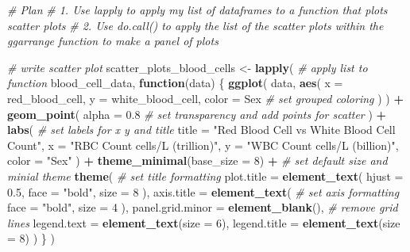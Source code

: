 \documentclass[
]{article}
\newenvironment{Shaded}{\begin{snugshade}}{\end{snugshade}}
\newcommand{\AttributeTok}[1]{\textcolor[rgb]{0.13,0.29,0.53}{#1}}
\newcommand{\CommentTok}[1]{\textcolor[rgb]{0.56,0.35,0.01}{\textit{#1}}}
\newcommand{\ControlFlowTok}[1]{\textcolor[rgb]{0.13,0.29,0.53}{\textbf{#1}}}
\newcommand{\DecValTok}[1]{\textcolor[rgb]{0.00,0.00,0.81}{#1}}
\newcommand{\FloatTok}[1]{\textcolor[rgb]{0.00,0.00,0.81}{#1}}
\newcommand{\FunctionTok}[1]{\textcolor[rgb]{0.13,0.29,0.53}{\textbf{#1}}}
\newcommand{\NormalTok}[1]{#1}
\newcommand{\OtherTok}[1]{\textcolor[rgb]{0.56,0.35,0.01}{#1}}
\newcommand{\SpecialCharTok}[1]{\textcolor[rgb]{0.81,0.36,0.00}{\textbf{#1}}}
\newcommand{\StringTok}[1]{\textcolor[rgb]{0.31,0.60,0.02}{#1}}
\begin{document}
\begin{Shaded}
\begin{Highlighting}[]
\CommentTok{\# Plan}
\CommentTok{\# 1. Use lapply to apply my list of dataframes to a function that plots scatter plots }
\CommentTok{\# 2. Use do.call() to apply the list of the scatter plots within the ggarrange function to make a panel of plots}

\CommentTok{\# write scatter plot }
\NormalTok{scatter\_plots\_blood\_cells }\OtherTok{\textless{}{-}} \FunctionTok{lapply}\NormalTok{( }\CommentTok{\# apply list to function}
\NormalTok{  blood\_cell\_data,}
  \ControlFlowTok{function}\NormalTok{(data) \{}
    \FunctionTok{ggplot}\NormalTok{(}
\NormalTok{      data,}
      \FunctionTok{aes}\NormalTok{(}
        \AttributeTok{x =}\NormalTok{ red\_blood\_cell,}
        \AttributeTok{y =}\NormalTok{ white\_blood\_cell,}
        \AttributeTok{color =}\NormalTok{ Sex }\CommentTok{\# set grouped coloring }
\NormalTok{      )}
\NormalTok{    ) }\SpecialCharTok{+}
      \FunctionTok{geom\_point}\NormalTok{(}
        \AttributeTok{alpha =} \FloatTok{0.8} \CommentTok{\# set transparency and add points for scatter}
\NormalTok{      ) }\SpecialCharTok{+}
      \FunctionTok{labs}\NormalTok{( }\CommentTok{\# set labels for x y and title}
        \AttributeTok{title =} \StringTok{"Red Blood Cell vs White Blood Cell Count"}\NormalTok{,}
        \AttributeTok{x =} \StringTok{"RBC Count cells/L (trillion)"}\NormalTok{,}
        \AttributeTok{y =} \StringTok{"WBC Count cells/L (billion)"}\NormalTok{,}
        \AttributeTok{color =} \StringTok{"Sex"}
\NormalTok{      ) }\SpecialCharTok{+}
      \FunctionTok{theme\_minimal}\NormalTok{(}\AttributeTok{base\_size =} \DecValTok{8}\NormalTok{) }\SpecialCharTok{+} \CommentTok{\# set default size and minial theme}
      \FunctionTok{theme}\NormalTok{( }\CommentTok{\# set title formatting}
        \AttributeTok{plot.title =} \FunctionTok{element\_text}\NormalTok{(}
          \AttributeTok{hjust =} \FloatTok{0.5}\NormalTok{,}
          \AttributeTok{face =} \StringTok{"bold"}\NormalTok{,}
          \AttributeTok{size =} \DecValTok{8}
\NormalTok{        ),}
        \AttributeTok{axis.title =} \FunctionTok{element\_text}\NormalTok{( }\CommentTok{\# set axis formatting}
          \AttributeTok{face =} \StringTok{"bold"}\NormalTok{,}
          \AttributeTok{size =} \DecValTok{4}
\NormalTok{        ),}
        \AttributeTok{panel.grid.minor =} \FunctionTok{element\_blank}\NormalTok{(), }\CommentTok{\# remove grid lines}
        \AttributeTok{legend.text =} \FunctionTok{element\_text}\NormalTok{(}\AttributeTok{size =} \DecValTok{6}\NormalTok{),}
        \AttributeTok{legend.title =} \FunctionTok{element\_text}\NormalTok{(}\AttributeTok{size =} \DecValTok{8}\NormalTok{)}
\NormalTok{      )}
\NormalTok{  \}}
\NormalTok{)}


\end{Highlighting}
\end{Shaded}
\end{document}
